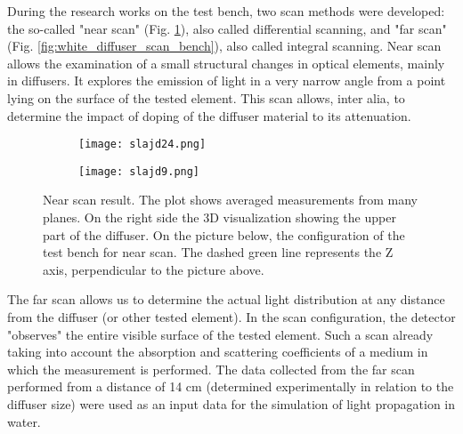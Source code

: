 \documentclass[a4paper,11pt]{article}
\begin{document}
During the research works on the test bench, two scan methods were developed: the so-called "near scan" (Fig. \ref{fig:near_scan}), also called differential scanning, and "far scan" (Fig. \ref{fig:white_diffuser_scan_bench}), also called integral scanning.
%
Near scan allows the examination of a small structural changes in optical elements, mainly in diffusers. It explores the emission of light in a very narrow angle from a point lying on the surface of the tested element. This scan allows, inter alia, to determine the impact of doping of the diffuser material to its attenuation. 

\begin{figure}[H]
	\vspace*{-2ex}
	\centering
	\begin{subfigure}[t]{\textwidth}
	\texttt{[image: slajd24.png]}
	\end{subfigure}
	\hfill
	\begin{subfigure}[t]{\textwidth}
		\vspace*{-17ex}
	\hfill
	\texttt{[image: slajd9.png]}
	\end{subfigure}
	\vspace*{-5ex}
	\caption{Near scan result. The plot shows averaged measurements from many planes. On the right side the 3D visualization showing the upper part of the diffuser. On the picture below, the configuration of the test bench for near scan. The dashed green line represents the Z axis, perpendicular to the picture above.}
	\label{fig:near_scan}
	\vspace*{-3ex}
\end{figure}


The far scan allows us to determine the actual light distribution at any distance from the diffuser (or other tested element). In the scan configuration, the detector "observes" the entire visible surface of the tested element. Such a scan already taking into account the absorption and scattering coefficients of a medium in which the measurement is performed. The data collected from the far scan performed from a distance of 14 cm (determined experimentally in relation to the diffuser size) were used as an input data for the simulation of light propagation in water.
\end{document}
